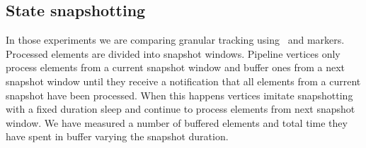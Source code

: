 \subsection{State snapshotting} \label{snapshotting}

In those experiments we are comparing granular tracking using \tracker\ and markers. Processed elements are divided into snapshot windows. Pipeline vertices only process elements from a current snapshot window and buffer ones from a next snapshot window until they receive a notification that all elements from a current snapshot have been processed. When this happens vertices imitate snapshotting with a fixed duration sleep and continue to process elements from next snapshot window. We have measured a number of buffered elements and total time they have spent in buffer varying the snapshot duration.

